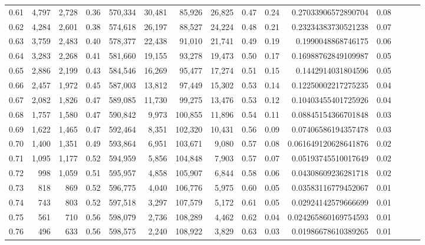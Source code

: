 \begin{tabular}{rrrrrrrrrrrrrrr}
0.61 &   4,797 &  2,728 &  0.36 &  570,334 &   30,481 &   85,926 &   26,825 &  0.47 &  0.24 &     0.27033906572890704 &      0.08 \\
0.62 &   4,284 &  2,601 &  0.38 &  574,618 &   26,197 &   88,527 &   24,224 &  0.48 &  0.21 &     0.23234383730521238 &      0.07 \\
0.63 &   3,759 &  2,483 &  0.40 &  578,377 &   22,438 &   91,010 &   21,741 &  0.49 &  0.19 &      0.1990048868746175 &      0.06 \\
0.64 &   3,283 &  2,268 &  0.41 &  581,660 &   19,155 &   93,278 &   19,473 &  0.50 &  0.17 &     0.16988762849109987 &      0.05 \\
0.65 &   2,886 &  2,199 &  0.43 &  584,546 &   16,269 &   95,477 &   17,274 &  0.51 &  0.15 &      0.1442914031804596 &      0.05 \\
0.66 &   2,457 &  1,972 &  0.45 &  587,003 &   13,812 &   97,449 &   15,302 &  0.53 &  0.14 &     0.12250002217275235 &      0.04 \\
0.67 &   2,082 &  1,826 &  0.47 &  589,085 &   11,730 &   99,275 &   13,476 &  0.53 &  0.12 &     0.10403455401725926 &      0.04 \\
0.68 &   1,757 &  1,580 &  0.47 &  590,842 &    9,973 &  100,855 &   11,896 &  0.54 &  0.11 &     0.08845154366701848 &      0.03 \\
0.69 &   1,622 &  1,465 &  0.47 &  592,464 &    8,351 &  102,320 &   10,431 &  0.56 &  0.09 &     0.07406586194357478 &      0.03 \\
0.70 &   1,400 &  1,351 &  0.49 &  593,864 &    6,951 &  103,671 &    9,080 &  0.57 &  0.08 &    0.061649120628641876 &      0.02 \\
0.71 &   1,095 &  1,177 &  0.52 &  594,959 &    5,856 &  104,848 &    7,903 &  0.57 &  0.07 &     0.05193745510017649 &      0.02 \\
0.72 &     998 &  1,059 &  0.51 &  595,957 &    4,858 &  105,907 &    6,844 &  0.58 &  0.06 &     0.04308609236281718 &      0.02 \\
0.73 &     818 &    869 &  0.52 &  596,775 &    4,040 &  106,776 &    5,975 &  0.60 &  0.05 &     0.03583116779452067 &      0.01 \\
0.74 &     743 &    803 &  0.52 &  597,518 &    3,297 &  107,579 &    5,172 &  0.61 &  0.05 &     0.02924142579666699 &      0.01 \\
0.75 &     561 &    710 &  0.56 &  598,079 &    2,736 &  108,289 &    4,462 &  0.62 &  0.04 &    0.024265860169754593 &      0.01 \\
0.76 &     496 &    633 &  0.56 &  598,575 &    2,240 &  108,922 &    3,829 &  0.63 &  0.03 &     0.01986678610389265 &      0.01 \\

\end{tabular}
